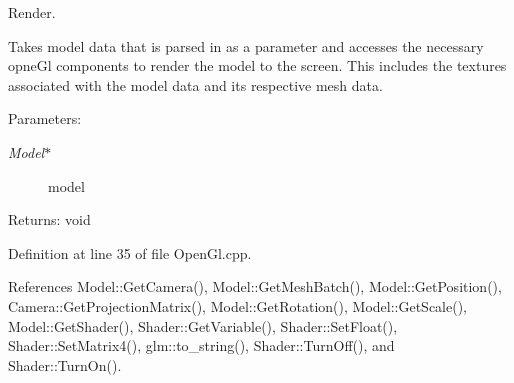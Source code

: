 Render. 

Takes model data that is parsed in as a parameter and accesses the necessary opneGl components to render the model to the screen. This includes the textures associated with the model data and its respective mesh data.

\begin{Desc}
\item[Parameters:]
\begin{description}
\item[{\em Model$\ast$}]model \end{description}
\end{Desc}
\begin{Desc}
\item[Returns:]void \end{Desc}


Definition at line 35 of file OpenGl.cpp.

References Model::GetCamera(), Model::GetMeshBatch(), Model::GetPosition(), Camera::GetProjectionMatrix(), Model::GetRotation(), Model::GetScale(), Model::GetShader(), Shader::GetVariable(), Shader::SetFloat(), Shader::SetMatrix4(), glm::to\_\-string(), Shader::TurnOff(), and Shader::TurnOn().


